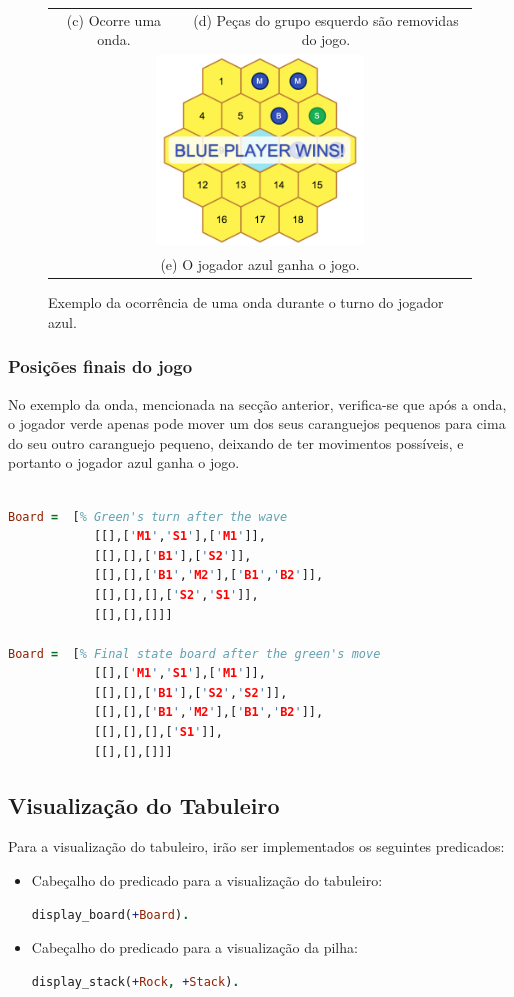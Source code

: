 \documentclass[a4paper]{article}
\begin{document}
\begin{figure}
\begin{tabular}{cc}
(c) Ocorre uma onda. & (d) Peças do grupo esquerdo são removidas do jogo. \\[6pt]
\multicolumn{2}{c}{\includegraphics[width=55mm]{img/end_game.png} }\\
\multicolumn{2}{c}{(e) O jogador azul ganha o jogo.}
\end{tabular}
\caption{Exemplo da ocorrência de uma onda durante o turno do jogador azul.}
\label{fig:intermedia}
\end{figure}

\newpage

\subsubsection{Posições finais do jogo}

No exemplo da onda, mencionada na secção anterior, verifica-se que após a onda, o jogador verde apenas pode mover um dos seus caranguejos pequenos para cima do seu outro caranguejo pequeno, deixando de ter movimentos possíveis, e portanto o jogador azul ganha o jogo.
\begin{lstlisting}[language=Prolog]

Board =  [% Green's turn after the wave
    	 	[[],['M1','S1'],['M1']],
         	[[],[],['B1'],['S2']],
         	[[],[],['B1','M2'],['B1','B2']],
    	 	[[],[],[],['S2','S1']],
    	 	[[],[],[]]]
         
Board =  [% Final state board after the green's move
    	 	[[],['M1','S1'],['M1']],
         	[[],[],['B1'],['S2','S2']],
         	[[],[],['B1','M2'],['B1','B2']],
    	 	[[],[],[],['S1']],
    	 	[[],[],[]]]
\end{lstlisting}

\subsection{Visualização do Tabuleiro} 

Para a visualização do tabuleiro, irão ser implementados os seguintes predicados:
\begin{itemize}
\item Cabeçalho do predicado para a visualização do tabuleiro:
\begin{lstlisting}[language=Prolog]
display_board(+Board).
\end{lstlisting}
\item Cabeçalho do predicado para a visualização da pilha:
\begin{lstlisting}[language=Prolog]
display_stack(+Rock, +Stack).
\end{lstlisting}
\end{itemize}
\end{document}
